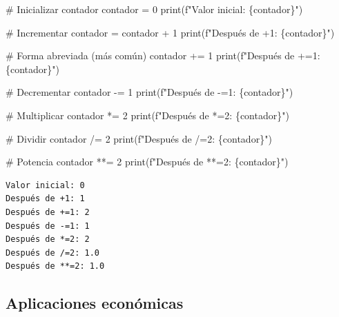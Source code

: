 \documentclass[
  doc,
  floatsintext,
  longtable,
  a4paper,
  nolmodern,
  notxfonts,
  notimes,
  12pt,
  colorlinks=true,linkcolor=blue,citecolor=blue,urlcolor=blue]{apa7}
\newenvironment{Shaded}{\begin{snugshade}}{\end{snugshade}}
\newcommand{\BuiltInTok}[1]{\textcolor[rgb]{0.00,0.23,0.31}{#1}}
\newcommand{\CommentTok}[1]{\textcolor[rgb]{0.37,0.37,0.37}{#1}}
\newcommand{\DecValTok}[1]{\textcolor[rgb]{0.68,0.00,0.00}{#1}}
\newcommand{\NormalTok}[1]{\textcolor[rgb]{0.00,0.23,0.31}{#1}}
\newcommand{\OperatorTok}[1]{\textcolor[rgb]{0.37,0.37,0.37}{#1}}
\newcommand{\SpecialCharTok}[1]{\textcolor[rgb]{0.37,0.37,0.37}{#1}}
\newcommand{\SpecialStringTok}[1]{\textcolor[rgb]{0.13,0.47,0.30}{#1}}
\begin{document}
\begin{Shaded}
\begin{Highlighting}[]
\CommentTok{\# Inicializar contador}
\NormalTok{contador }\OperatorTok{=} \DecValTok{0}
\BuiltInTok{print}\NormalTok{(}\SpecialStringTok{f"Valor inicial: }\SpecialCharTok{\{}\NormalTok{contador}\SpecialCharTok{\}}\SpecialStringTok{"}\NormalTok{)}

\CommentTok{\# Incrementar}
\NormalTok{contador }\OperatorTok{=}\NormalTok{ contador }\OperatorTok{+} \DecValTok{1}
\BuiltInTok{print}\NormalTok{(}\SpecialStringTok{f"Después de +1: }\SpecialCharTok{\{}\NormalTok{contador}\SpecialCharTok{\}}\SpecialStringTok{"}\NormalTok{)}

\CommentTok{\# Forma abreviada (más común)}
\NormalTok{contador }\OperatorTok{+=} \DecValTok{1}
\BuiltInTok{print}\NormalTok{(}\SpecialStringTok{f"Después de +=1: }\SpecialCharTok{\{}\NormalTok{contador}\SpecialCharTok{\}}\SpecialStringTok{"}\NormalTok{)}

\CommentTok{\# Decrementar}
\NormalTok{contador }\OperatorTok{{-}=} \DecValTok{1}
\BuiltInTok{print}\NormalTok{(}\SpecialStringTok{f"Después de {-}=1: }\SpecialCharTok{\{}\NormalTok{contador}\SpecialCharTok{\}}\SpecialStringTok{"}\NormalTok{)}

\CommentTok{\# Multiplicar}
\NormalTok{contador }\OperatorTok{*=} \DecValTok{2}
\BuiltInTok{print}\NormalTok{(}\SpecialStringTok{f"Después de *=2: }\SpecialCharTok{\{}\NormalTok{contador}\SpecialCharTok{\}}\SpecialStringTok{"}\NormalTok{)}

\CommentTok{\# Dividir}
\NormalTok{contador }\OperatorTok{/=} \DecValTok{2}
\BuiltInTok{print}\NormalTok{(}\SpecialStringTok{f"Después de /=2: }\SpecialCharTok{\{}\NormalTok{contador}\SpecialCharTok{\}}\SpecialStringTok{"}\NormalTok{)}

\CommentTok{\# Potencia}
\NormalTok{contador }\OperatorTok{**=} \DecValTok{2}
\BuiltInTok{print}\NormalTok{(}\SpecialStringTok{f"Después de **=2: }\SpecialCharTok{\{}\NormalTok{contador}\SpecialCharTok{\}}\SpecialStringTok{"}\NormalTok{)}
\end{Highlighting}
\end{Shaded}

\begin{verbatim}
Valor inicial: 0
Después de +1: 1
Después de +=1: 2
Después de -=1: 1
Después de *=2: 2
Después de /=2: 1.0
Después de **=2: 1.0
\end{verbatim}

\subsection{Aplicaciones económicas}\label{aplicaciones-econuxf3micas}
\end{document}
